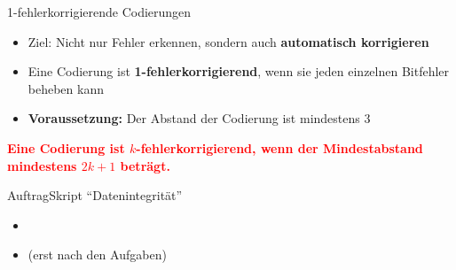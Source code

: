 \begin{frame}[fragile]{1-fehlerkorrigierende Codierungen}
    \begin{itemize}
        \item Ziel: Nicht nur Fehler erkennen, sondern auch \textbf{automatisch korrigieren}
        \item Eine Codierung ist \textbf{1-fehlerkorrigierend}, wenn sie jeden einzelnen Bitfehler beheben kann
        \item \textbf{Voraussetzung:} Der Abstand der Codierung ist mindestens 3
    \end{itemize}
    \begin{center}
        \textcolor{red}{\textbf{Eine Codierung ist $k$-fehlerkorrigierend, wenn der Mindestabstand mindestens $2k+1$ beträgt.}}
    \end{center}
\end{frame}


\begin{frame}{Auftrag}{Skript \enquote{Datenintegrität}}
    \begin{itemize}
        \item {}
        \item {} (erst nach den Aufgaben)
    \end{itemize}
\end{frame}